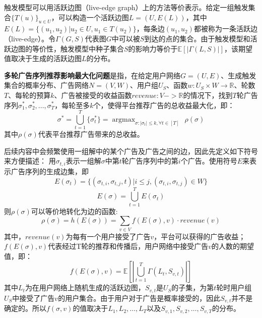 触发模型可以用活跃边图（live-edge graph）上的方法等价表示。给定一组触发集合$\{T(u)\}_{u\in U}$，可以构造一个活跃边图$L=(U,E(L))$，其中$E(L)=\{(u_1,u_2)|u_2\in U, u_1\in T(u_2)\}$，每条边$(u_1,u_2)$都被称为一条活跃边（live-edge）。令$\Gamma(G,S)$代表图$G$中可以被$S$到达的点的集合。由于触发模型和活跃边图的等价性，触发模型中种子集合$S$的影响力等价于$\mathbb{E}[|\Gamma(L,S)|]$，该期望值取决于生成的活跃边图$L$的分布。
\begin{definition}
{\bfseries 多轮广告序列推荐影响最大化问题}是指，在给定用户网络$G=(U,E)$、生成触发集合的概率分布、广告网络$N = (V, W)$、用户组$U_S$、函数$w:U_S \times W \to \mathbb{R}$、轮数$T$、每轮的预算$k$、广告被接受的收益函数$revenue:V->\mathbb{R}$的情况下，找到$T$轮广告序列$\sigma_1^*,\sigma_2^*,...,\sigma_T^*$，每轮至多$k$个，使得平台推荐广告的总收益最大化，即：
\begin{equation}
\sigma^* = \bigcup _{t=1} ^T \{\sigma_t^*\} = \mathop{\arg\max}_{\sigma:|\sigma_t|\le k,\forall t \in[T]} \ \ \rho(\sigma)
\end{equation}
\noindent 其中$\rho(\sigma)$代表平台推荐广告带来的总收益。
\end{definition}

后续内容中会频繁使用一组解中的某个广告及广告之间的边，因此先定义如下符号来方便描述：
用$\sigma_{t,i}$表示一组解$\sigma$中第$t$轮广告序列中的第$i$个广告。使用符号$E$来表示广告序列的生成边集，即
\begin{equation}
E(\sigma_t)=\{(\sigma_{t,i},\sigma_{t,j},t)|i \le j, (\sigma_{t,i},\sigma_{t,j})\in W\}
\end{equation}
\begin{equation}
E(\sigma)= \bigcup_{t=1}^T E(\sigma_t)
\end{equation}
\noindent 则$\rho(\sigma)$可以等价地转化为边的函数:
\begin{equation}
\label{equ:def_h}
\rho(\sigma) = h(E(\sigma)) = \sum_{v\in V}f(E(\sigma),v)\cdot revenue(v) 
\end{equation}
\noindent 其中，$revenue(v)$为每有一个用户接受了广告$v$，平台可以获得的广告收益；$f(E(\sigma),v)$代表经过T轮的推荐和传播后，用户网络中接受广告$v$的人数的期望值，即：
\begin{equation}
f(E(\sigma),v)=\mathbb{E}[|\bigcup_{t=1}^T\Gamma(L_t,S_{v,t})|]
\end{equation}
\noindent 其中$L_t$为在用户网络上随机生成的活跃边图，$S_{v,t}$是$U_S$的子集，为第$t$轮时用户组$U_S$中接受了广告$v$的用户集合。由于用户对于广告是概率接受的，因此$S_{v,t}$并不是确定的。所以$f(\sigma,v)$的值取决于$L_1,L_2,\ldots,L_T$以及$S_{v,1},S_{v,2},\ldots,S_{v,T}$的分布。

